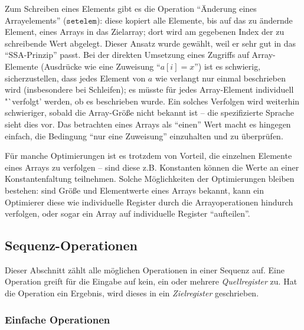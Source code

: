 \documentclass[twoside,a4paper,fleqn,12pt]{book}
\begin{document}
Zum Schreiben eines Elements gibt es die Operation "`Änderung eines Arrayelements"' ($\mathtt{setelem}$):
diese kopiert alle Elemente, bis auf das zu ändernde Element, eines Arrays in das Zielarray;
dort wird am gegebenen Index der zu schreibende Wert abgelegt.
Dieser Ansatz wurde gewählt, weil er sehr gut in das "`SSA-Prinzip"' passt.
Bei der direkten Umsetzung eines Zugriffs auf Array-Elemente (Ausdrücke wie eine Zuweisung "`$a[i] = x$"') ist es schwierig, sicherzustellen, dass
jedes Element von $a$ wie verlangt nur einmal beschrieben wird (insbesondere bei Schleifen); es
müsste für jedes Array-Element individuell "`verfolgt' werden, ob es beschrieben wurde.
Ein solches Verfolgen wird weiterhin schwieriger, sobald die Array-Größe nicht bekannt ist
-- die spezifizierte Sprache sieht dies vor. Das betrachten eines Arrays als "`einen"' Wert macht es hingegen einfach,
die Bedingung "`nur eine Zuweisung"' einzuhalten und zu überprüfen.

Für manche Optimierungen ist es trotzdem von Vorteil, die einzelnen Elemente eines Arrays zu verfolgen -- sind diese
z.B. Konstanten können die Werte an einer Konstantenfaltung teilnehmen. Solche Möglichkeiten der Optimierungen
bleiben bestehen: sind Größe und Elementwerte eines Arrays bekannt, kann ein Optimierer diese wie individuelle
Register durch die Arrayoperationen hindurch verfolgen, oder sogar ein Array auf individuelle Register "`aufteilen"'.

\subsection{Sequenz-Operationen}

Dieser Abschnitt zählt alle möglichen Operationen in einer Sequenz auf. Eine Operation greift für die Eingabe auf kein, ein oder mehrere
\emph{Quellregister} zu. Hat die Operation ein Ergebnis, wird dieses in ein \emph{Zielregister} geschrieben. 


\subsubsection{Einfache Operationen}
\end{document}
